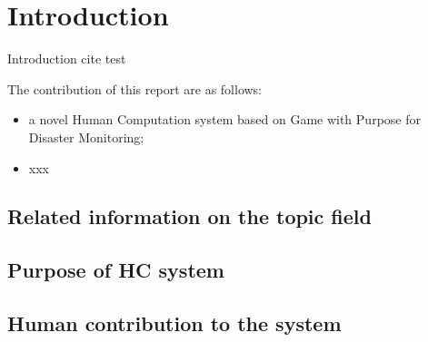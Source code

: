 \section{Introduction}

Introduction cite test \cite{Bry2013}

The contribution of this report are as follows:

\begin{itemize}
    \item a novel Human Computation system based on Game with Purpose for Disaster Monitoring;
    \item xxx
\end{itemize}

\subsection{Related information on the topic field}
\subsection{Purpose of HC system}
\subsection{Human contribution to the system}
